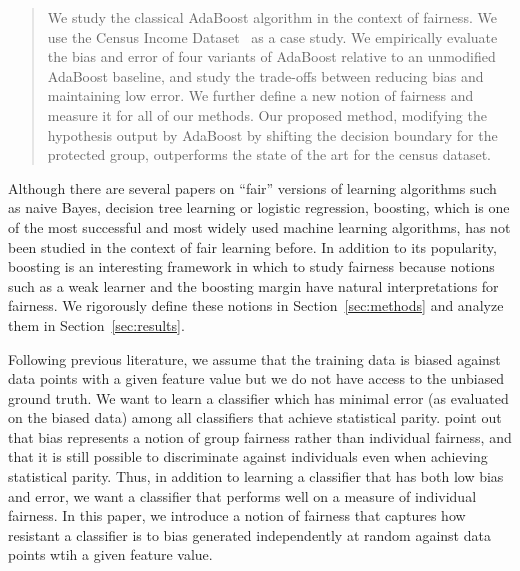 \documentclass{article}
\begin{document}


\begin{abstract} 

We study the classical AdaBoost algorithm in the context of fairness.  We use
the Census Income Dataset~\citep{UCIAdult} as a case study.  We empirically
evaluate the bias and error of four variants of AdaBoost relative to an
unmodified AdaBoost baseline, and study the trade-offs between reducing bias
and maintaining low error. We further define a new notion of fairness and
measure it for all of our methods.  Our proposed method, modifying the
hypothesis output by AdaBoost by shifting the decision boundary for the
protected group, outperforms the state of the art for the census dataset.

\end{abstract}

Although there are several papers on ``fair'' versions of learning algorithms
such as naive Bayes, decision tree learning or logistic regression, boosting,
which is one of the most successful and most widely used machine learning
algorithms, has not been studied in the context of fair learning before. In
addition to its popularity, boosting is an interesting framework in which to
study fairness because notions such as a weak learner and the boosting margin
have natural interpretations for fairness. We rigorously define these notions
in Section~\ref{sec:methods} and analyze them in Section~\ref{sec:results}.

Following previous literature, we assume that the training data is biased
against data points with a given feature value but we do not have access to the
unbiased ground truth. We want to learn a classifier which has minimal error
(as evaluated on the biased data) among all classifiers that achieve
statistical parity. \citet{DworkHPR12} point out that bias represents a notion
of group fairness rather than individual fairness, and that it is still
possible to discriminate against individuals even when achieving statistical
parity.  Thus, in addition to learning a classifier that has both low bias and
error, we want a classifier that performs well on a measure of individual
fairness.  In this paper, we introduce a notion of fairness that captures how
resistant a classifier is to bias generated independently at random against
data points wtih a given feature value.
 
\end{document}
